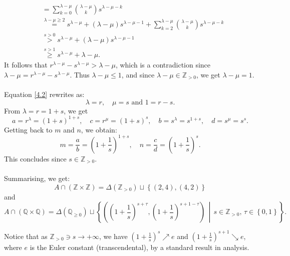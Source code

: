 \begin{solution}
\begin{align*}
        &= \sum_{k = 0}^{\lambda - \mu} \binom{\lambda - \mu}{k} s^{\lambda - \mu - k} \\
        &\overset{\lambda - \mu \geq 2}{=} s^{\lambda - \mu} + (\lambda - \mu) s^{\lambda - \mu - 1} + \sum_{k = 2}^{\lambda - \mu} \binom{\lambda - \mu}{k} s^{\lambda - \mu - k} \\
        &\overset{s > 0}{>} s^{\lambda - \mu} + (\lambda - \mu) s^{\lambda - \mu - 1} \\
        &\overset{s > 1}{\geq} s^{\lambda - \mu} + \lambda - \mu.
    \end{align*}
    It follows that \( r^{\lambda - \mu} - s^{\lambda - \mu} > \lambda - \mu \), which is a contradiction since \( \lambda - \mu = r^{\lambda - \mu} - s^{\lambda - \mu} \). Thus \( \lambda - \mu \leq 1 \), and since \( \lambda - \mu \in \mathbb{Z}_{>0} \), we get \( \lambda - \mu = 1 \).
    \\\\
    Equation \eqref{4.2} rewrites as:
    \[
        \lambda = r, \quad \mu = s \text{ and } 1 = r - s.
    \]
    From \( \lambda = r = 1 + s \), we get
    \[
        a = r^{\lambda} = \left(1 + s\right)^{1 + s}, \quad c = r^{\mu} = \left(1 + s\right)^s, \quad b = s^{\lambda} = s^{1 + s}, \quad d = s^{\mu} = s^s.
    \]
    Getting back to \( m \) and \( n \), we obtain:
    \[
        m = \frac{a}{b} = \left(1 + \frac{1}{s}\right)^{1 + s}, \quad n = \frac{c}{d} = \left(1 + \frac{1}{s}\right)^s.
    \]
    This concludes since \( s\in\mathbb{Z}_{>0} \).
    \\\\
    Summarising, we get:
    \[
        A\cap\left(\mathbb{Z} \times \mathbb{Z}\right) = \Delta\left(\mathbb{Z}_{>0}\right) \sqcup \left\{\left(2,4\right), \left(4,2\right)\right\}
    \]
    and
    \[
        A \cap \left(\mathbb{Q} \times \mathbb{Q}\right) = \Delta\left(\mathbb{Q}_{\geq 0}\right) \sqcup \left\{ \left( \left(1 + \frac{1}{s} \right)^{s + \tau}, \left(1 + \frac{1}{s} \right)^{s + 1 - \tau} \right) \,\middle|\, s \in \mathbb{Z}_{>0},\, \tau \in \left\{0,1\right\} \right\}.
    \]
    \begin{remark}
        Notice that as \( \mathbb{Z}_{>0}\ni s \to +\infty \), we have \( \left(1 + \frac{1}{s} \right)^{s} \nearrow e \) and \( \left(1 + \frac{1}{s} \right)^{s+1} \searrow e \), where \( e \) is the Euler constant (transcendental), by a standard result in analysis.
    \end{remark}


\end{solution}
